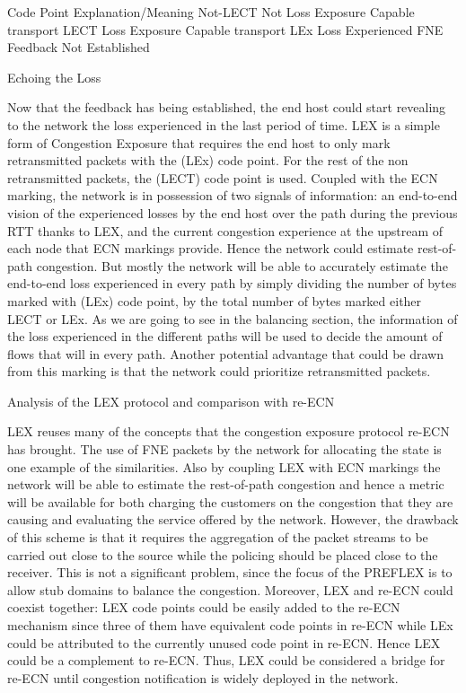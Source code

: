 Code Point
Explanation/Meaning
Not-LECT
Not Loss Exposure Capable transport
LECT
Loss Exposure Capable transport
LEx
Loss Experienced
FNE
Feedback Not Established

Echoing the Loss

Now that the feedback has being established, the end host could start revealing to the network the loss experienced in the last period of time. LEX is a simple form of Congestion Exposure that requires the end host to only mark retransmitted packets with the (LEx) code point. For the rest of the non retransmitted packets, the (LECT) code point is used. Coupled with the ECN marking, the network is in possession of two signals of information: an end-to-end vision of the experienced losses by the end host over the path during the previous RTT thanks to LEX, and the  current congestion experience at the upstream of each node that ECN markings provide. Hence the network could estimate rest-of-path congestion. But mostly the network will be able to accurately estimate the end-to-end loss experienced in every path by simply dividing the number of bytes marked with (LEx) code point,  by the total number of bytes marked either LECT or LEx. As we are going to see in the balancing section, the information of the loss experienced in the different paths will be used to decide the amount of flows that will in every path. Another potential advantage that could be drawn from this marking is that the network could prioritize retransmitted packets.

Analysis of the LEX protocol and comparison with re-ECN

LEX reuses many of the concepts that the congestion exposure protocol re-ECN has brought. The use of FNE packets by the network for allocating the state is one example of the similarities. Also by coupling LEX with ECN markings the network will be able to estimate the rest-of-path congestion and hence a metric will be available for both charging the customers on the congestion that they are causing and evaluating the service offered by the network. However, the drawback of this scheme is that it requires the aggregation of the packet streams to be carried out close to the source while the policing should be placed close to the receiver. This is not a significant problem, since the focus of the PREFLEX is to allow stub domains to balance the congestion. Moreover, LEX and re-ECN could coexist together: LEX code points could be easily added to the re-ECN mechanism since three of them have equivalent code points in re-ECN while LEx could be attributed to the currently unused code point in re-ECN. Hence LEX could be a complement to re-ECN. Thus, LEX could be considered a bridge for re-ECN until congestion notification is widely deployed in the network.

